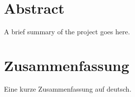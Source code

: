 \section*{Abstract}

A brief summary of the project goes here. 

\newpage

\section*{Zusammenfassung}

Eine kurze Zusammenfassung auf deutsch.